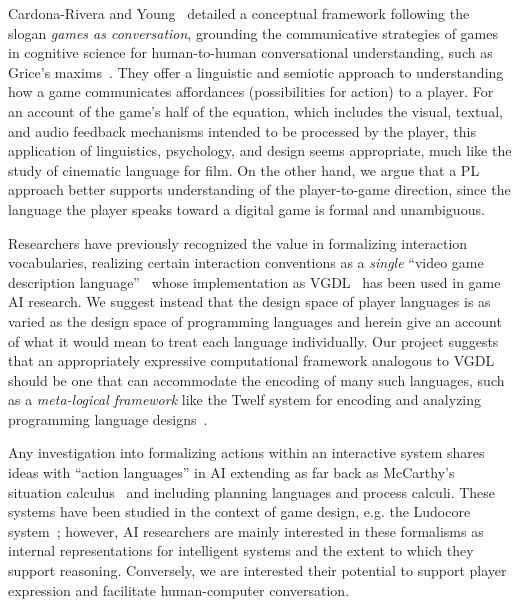 
Cardona-Rivera and Young~\cite{cardona2014games}
detailed a conceptual framework following the slogan {\em games as
conversation}, grounding the communicative strategies of games in cognitive
science for human-to-human conversational understanding, such as Grice's
maxims~\cite{grice1975logic}. They offer a linguistic and semiotic approach to
understanding how a game communicates affordances (possibilities for
action) to a player.  For an account of the game's half of the equation,
which includes the visual, textual, and audio feedback mechanisms intended
to be processed by the player, this application of linguistics, psychology,
and design seems appropriate, much like the study of cinematic language for
film.  On the other hand, we argue that a PL approach better supports
understanding of the player-to-game direction, since the language the
player speaks toward a digital game is formal and unambiguous.

Researchers have previously recognized the value in formalizing interaction
vocabularies, realizing certain interaction conventions as a {\em single}
``video game description language''~\cite{ebner2013towards} whose
implementation as VGDL~\cite{schaul2013video} has been used in game AI research. We
suggest instead that the design space of player languages is as varied as
the design space of programming languages and herein give an account of
what it would mean to treat each language individually.
Our project suggests that an appropriately expressive computational
framework analogous to VGDL should be one that can accommodate the encoding
of many such languages, such as a {\em meta-logical framework} like the
Twelf system for encoding and analyzing programming language
designs~\cite{pfenning1999system}. 

Any investigation into formalizing actions within an interactive system
shares ideas with ``action languages'' in AI extending as far back as
McCarthy's situation calculus~\cite{mccarthy1969some} and including
planning languages and process calculi.  These systems have been studied in the
context of game design, e.g. the Ludocore system~\cite{smith2010ludocore};
however, AI researchers are mainly interested in these formalisms as internal
representations for intelligent systems and the extent to which they support
reasoning.  Conversely, we are interested their potential to support player
expression and facilitate human-computer conversation.



